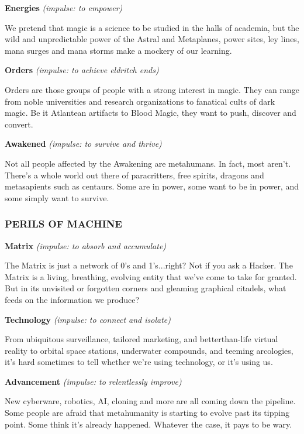 \documentclass[oneside,10pt]{article}
\begin{document}
\begin{multicols}{2}
\textbf{Energies} \textit{(impulse: to empower)}

We pretend that magic is a science to be studied in the halls
of academia, but the wild and unpredictable power of the Astral and Metaplanes, power sites, ley lines, mana surges and
mana storms make a mockery of our learning.

\textbf{Orders} \textit{(impulse: to achieve eldritch ends)}

Orders are those groups of people with a strong interest in
magic. They can range from noble universities and research
organizations to fanatical cults of dark magic. Be it Atlantean
artifacts to Blood Magic, they want to push, discover and
convert.

\textbf{Awakened} \textit{(impulse: to survive and thrive)}

Not all people affected by the Awakening are metahumans.
In fact, most aren’t. There’s a whole world out there of paracritters, free spirits, dragons and metasapients such as centaurs. Some are in power, some want to be in power, and
some simply want to survive.

\subsubsection{PERILS OF MACHINE}

\textbf{Matrix} \textit{(impulse: to absorb and accumulate)}

The Matrix is just a network of 0’s and 1’s...right? Not if you
ask a Hacker. The Matrix is a living, breathing, evolving entity
that we’ve come to take for granted. But in its unvisited or
forgotten corners and gleaming graphical citadels, what feeds
on the information we produce?

\textbf{Technology} \textit{(impulse: to connect and isolate)}

From ubiquitous surveillance, tailored marketing, and betterthan-life virtual reality to orbital space stations, underwater
compounds, and teeming arcologies, it’s hard sometimes to
tell whether we’re using technology, or it’s using us.

\textbf{Advancement} \textit{(impulse: to relentlessly improve)}

New cyberware, robotics, AI, cloning and more are all coming down the pipeline. Some people are afraid that metahumanity is starting to evolve past its tipping point. Some think
it’s already happened. Whatever the case, it pays to be wary.


\end{multicols}
\end{document}
